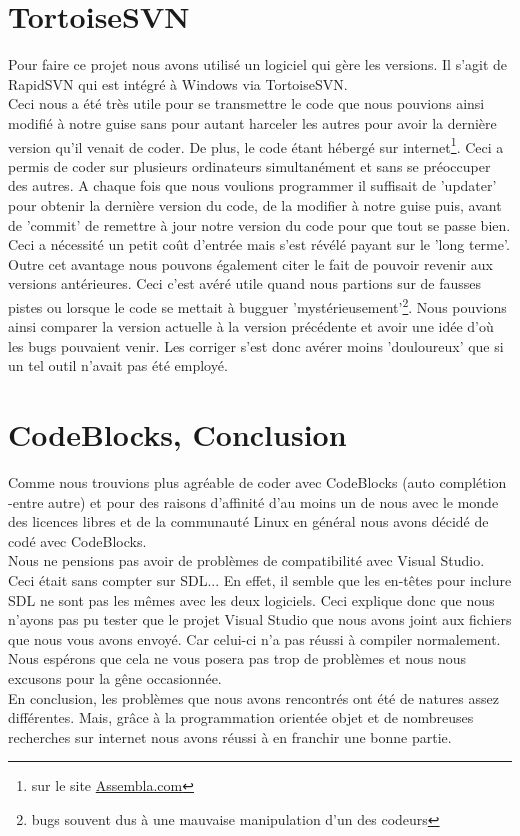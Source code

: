\documentclass[a4paper,11pt]{article}
\begin{document}
\section{TortoiseSVN}
Pour faire ce projet nous avons utilisé un logiciel qui gère les versions. Il s'agit de RapidSVN qui est intégré à Windows via TortoiseSVN.\\

Ceci nous a été très utile pour se transmettre le code que nous pouvions ainsi modifié à notre guise sans pour autant harceler les autres pour avoir la dernière version qu'il venait de coder. De plus, le code étant hébergé sur internet\footnote{ sur le site \href{https://www.assembla.com/start}{Assembla.com}}. Ceci a permis de coder sur plusieurs ordinateurs simultanément et sans se préoccuper des autres. A chaque fois que nous voulions programmer il suffisait de 'updater' pour obtenir la dernière version du code, de la modifier à notre guise puis, avant de 'commit' de remettre à jour notre version du code pour que tout se passe bien. Ceci a nécessité un petit coût d'entrée mais s'est révélé payant sur le 'long terme'.\\

Outre cet avantage nous pouvons également citer le fait de pouvoir revenir aux versions antérieures. Ceci c'est avéré utile quand nous partions sur de fausses pistes ou lorsque le code se mettait à bugguer 'mystérieusement'\footnote{bugs souvent dus à une mauvaise manipulation d'un des codeurs}. Nous pouvions ainsi comparer la version actuelle à la version précédente et avoir une idée d'où les bugs pouvaient venir. Les corriger s'est donc avérer moins 'douloureux' que si un tel outil n'avait pas été employé.
\clearpage
\section{CodeBlocks, Conclusion}
Comme nous trouvions plus agréable de coder avec CodeBlocks (auto complétion -entre autre) et pour des raisons d'affinité d'au moins un de nous avec le monde des licences libres et de la communauté Linux en général nous avons décidé de codé avec CodeBlocks. \\

Nous ne pensions pas avoir de problèmes de compatibilité avec Visual Studio. Ceci était sans compter sur SDL... En effet, il semble que les en-têtes pour inclure SDL ne sont pas les mêmes avec les deux logiciels. Ceci explique donc que nous n'ayons pas pu tester que le projet Visual Studio que nous avons joint aux fichiers que nous vous avons envoyé. Car celui-ci n'a pas réussi à compiler normalement.\\
Nous espérons que cela ne vous posera pas trop de problèmes et nous nous excusons pour la gêne occasionnée.\\

En conclusion, les problèmes que nous avons rencontrés ont été de natures assez différentes. Mais, grâce à la programmation orientée objet et de nombreuses recherches sur internet nous avons réussi à en franchir une bonne partie. \\
\end{document}
